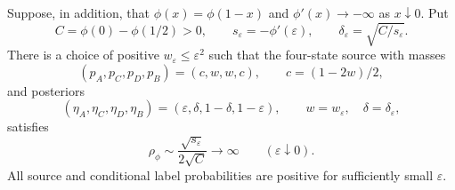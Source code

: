 \begin{theorem}
\label{thm:gen-endpoint}
Suppose, in addition, that $\phi(x)=\phi(1-x)$ and
$\phi'(x)\to-\infty$ as $x\downarrow0$. Put
\[
 C=\phi(0)-\phi(1/2)>0,\qquad
 s_\varepsilon=-\phi'(\varepsilon),\qquad
 \delta_\varepsilon=\sqrt{C/s_\varepsilon}.
\]
There is a choice of positive $w_\varepsilon\le\varepsilon^2$ such
that the four-state source with masses
\[
 (p_A,p_C,p_D,p_B)=(c,w,w,c),\qquad c=(1-2w)/2,
\]
and posteriors
\[
 (\eta_A,\eta_C,\eta_D,\eta_B)
  =(\varepsilon,\delta,1-\delta,1-\varepsilon),
 \qquad w=w_\varepsilon,\quad\delta=\delta_\varepsilon,
\]
satisfies
\begin{equation}
 \rho_\phi
  \sim \frac{\sqrt{s_\varepsilon}}{2\sqrt C}
  \longrightarrow\infty
  \qquad(\varepsilon\downarrow0).
 \label{eq:gen-rate}
\end{equation}
All source and conditional label probabilities are positive for
sufficiently small $\varepsilon$.
\end{theorem}

